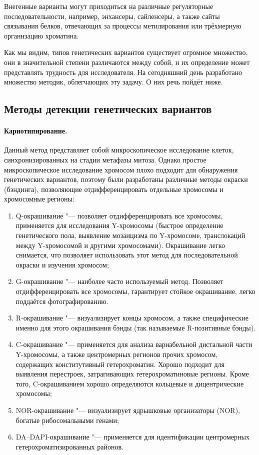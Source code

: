 \documentclass[a4paper,12pt]{article}
\begin{document}
Внегенные варианты могут приходиться на различные регуляторные последовательности, например, энхансеры, сайленсеры, а также сайты связывания белков, отвечающих за процессы метилирования или трёхмерную организацию хроматина.

Как мы видим, типов генетических вариантов существует огромное множество, они в значительной степени различаются между собой, и их определение может представлять трудность для исследователя.
На сегодняшний день разработано множество методик, облегчающих эту задачу.
О них речь пойдёт ниже.

\subsection{Методы детекции генетических вариантов}

\paragraph{Кариотипирование.}
Данный метод представляет собой микроскопическое исследование клеток, синхронизированных на стадии метафазы митоза.
Однако простое микроскопическое исследование хромосом плохо подходит для обнаружения генетических вариантов, поэтому были разработаны различные методы окраски (бэндинга), позволяющие отдифференцировать отдельные хромосомы и хромосомные регионы\cite{Schreck_2001}:

\begin{enumerate}
\item Q-окрашивание "--- позволяет отдифференцировать все хромосомы, применяется для исследования Y-хромосомы (быстрое определение генетического пола, выявление мозаицизма по Y-хромосоме, транслокаций между Y-хромосомой и другими хромосомами).
Окрашивание легко снимается, что позволяет использовать этот метод для последовательной окраски и изучения хромосом;
\item G-окрашивание "--- наиболее часто используемый метод.
Позволяет отдифференцировать все хромосомы, гарантирует стойкое окрашивание, легко поддаётся фотографированию.
\item R-окрашивание "--- визуализирует концы хромосом, а также специфические именно для этого окрашивания бэнды (так называемые R-позитивные бэнды).
\item C-окрашивание "--- применяется для анализа вариабельной дистальной части Y-хромосомы, а также центромерных регионов прочих хромосом, содержащих конститутивный гетерохроматин.
Хорошо подходит для выявления перестроек, затрагивающих гетерохроматиновые регионы.
Кроме того, C-окрашиванием хорошо определяются кольцевые и дицентрические хромосомы;
\item NOR-окрашивание "--- визуализирует ядрышковые организаторы (NOR), богатые рибосомальными генами;
\item DA--DAPI-окрашивание "--- применяется для идентификации центромерных гетерохроматизированных районов.
\end{enumerate}
\end{document}
